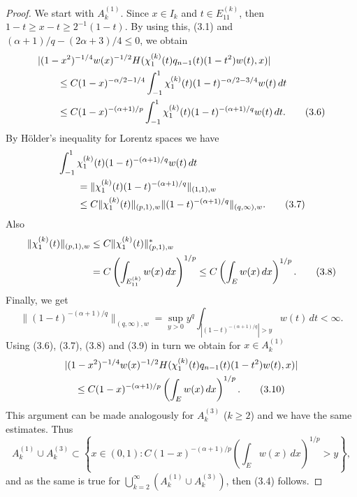 \documentclass[10pt,a4paper]{article}
\theoremstyle{plain}
\theoremstyle{remark}
\begin{document}
\begin{proof}
We start with $A_{k}^{(1)}$. Since $x \in I_{k}$ and
$t \in E_{11}^{(k)}$, then $1-t \geq x-t \geq 2^{-1}(1-t)$. By
using this, (3.1) and $(\alpha+1)/q - (2\alpha+3)/4 \leq 0$, we obtain
\begin{align}
&|(1-x^{2})^{-1/4} w(x)^{-1/2} H(\chi_{1}^{(k)}(t)q_{n-1}(t)(1-t^{2})w(t),x)|
\notag \\
&\qquad\leq C(1-x)^{-\alpha/2-1/4}
\int_{-1}^{1} \chi_{1}^{(k)}(t) (1-t)^{-\alpha/2-3/4} w(t)\,dt
\notag \\
&\qquad\leq C(1-x)^{-(\alpha+1)/p}
\int_{-1}^{1} \chi_{1}^{(k)}(t) (1-t)^{-(\alpha+1)/q} w(t)\,dt.
\tag{3.6}
\end{align}
By H\"{o}lder's inequality for Lorentz spaces we have
\begin{align}
&\int_{-1}^{1} \chi_{1}^{(k)}(t) (1-t)^{-(\alpha+1)/q} w(t)\,dt \notag \\
&\qquad= \|\chi_{1}^{(k)}(t) (1-t)^{-(\alpha+1)/q}\|_{(1,1),w} \notag \\
&\qquad\leq C\|\chi_{1}^{(k)}(t)\|_{(p,1),w}
\|(1-t)^{-(\alpha+1)/q}\|_{(q,\infty),w}.
\tag{3.7}
\end{align}
Also
\begin{align}
\|\chi_{1}^{(k)}(t)\|_{(p,1),w}
&\leq C\|\chi_{1}^{(k)}(t)\|^{*}_{(p,1),w} \notag \\
&= C \left( \int_{E_{11}^{(k)}} w(x)\,dx \right)^{1/p}
\leq C \left( \int_{E} w(x)\,dx \right)^{1/p}.
\tag{3.8}
\end{align}
Finally, we get
\begin{equation}
\|(1-t)^{-(\alpha+1)/q}\|_{(q,\infty),w}
= \sup_{y > 0} y^{q} \int_{|(1-t)^{-(\alpha+1)/q}| > y} w(t)\,dt < \infty.
\tag{3.9}
\end{equation}
Using (3.6), (3.7), (3.8) and (3.9) in turn we obtain for $x \in A_{k}^{(1)}$
\begin{multline}
|(1-x^{2})^{-1/4} w(x)^{-1/2} H(\chi_{1}^{(k)}(t)q_{n-1}(t)(1-t^{2})w(t),x)|
\notag \\
\leq C(1-x)^{-(\alpha+1)/p} \left( \int_{E} w(x)\,dx \right)^{1/p}.
\tag{3.10}
\end{multline}
This argument can be made analogously for $A_{k}^{(3)}$ ($k \geq 2$)
and we have the same estimates. Thus
$$
A_{k}^{(1)} \cup A_{k}^{(3)} \subset \left\{ x \in
(0,1) : C(1-x)^{-(\alpha+1)/p} \left( \int_{E} w(x)\,dx \right)^{1/p}
> y \right\},
$$
and as the same is true for
$\bigcup_{k=2}^{\infty} (A_{k}^{(1)} \cup A_{k}^{(3)})$,
then (3.4) follows.


\end{proof}
\end{document}

